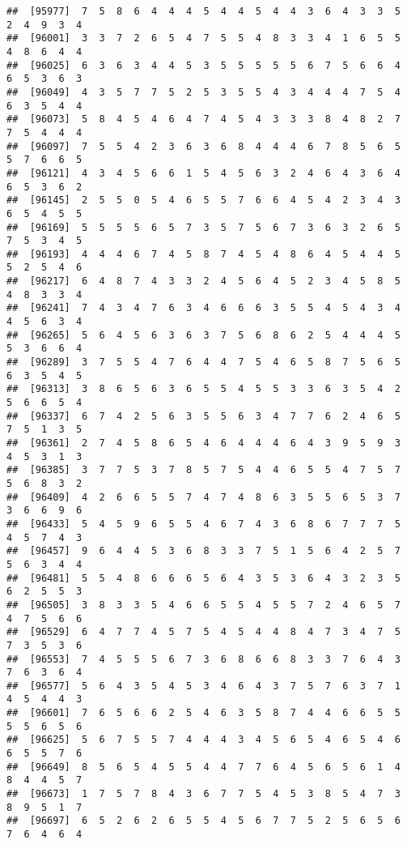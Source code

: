 \documentclass[
]{book}
\begin{document}
\begin{verbatim}
##  [95977]  7  5  8  6  4  4  4  5  4  4  5  4  4  3  6  4  3  3  5  2  4  9  3  4
##  [96001]  3  3  7  2  6  5  4  7  5  5  4  8  3  3  4  1  6  5  5  4  8  6  4  4
##  [96025]  6  3  6  3  4  4  5  3  5  5  5  5  5  6  7  5  6  6  4  6  5  3  6  3
##  [96049]  4  3  5  7  7  5  2  5  3  5  5  4  3  4  4  4  7  5  4  6  3  5  4  4
##  [96073]  5  8  4  5  4  6  4  7  4  5  4  3  3  3  8  4  8  2  7  7  5  4  4  4
##  [96097]  7  5  5  4  2  3  6  3  6  8  4  4  4  6  7  8  5  6  5  5  7  6  6  5
##  [96121]  4  3  4  5  6  6  1  5  4  5  6  3  2  4  6  4  3  6  4  6  5  3  6  2
##  [96145]  2  5  5  0  5  4  6  5  5  7  6  6  4  5  4  2  3  4  3  6  5  4  5  5
##  [96169]  5  5  5  5  6  5  7  3  5  7  5  6  7  3  6  3  2  6  5  7  5  3  4  5
##  [96193]  4  4  4  6  7  4  5  8  7  4  5  4  8  6  4  5  4  4  5  5  2  5  4  6
##  [96217]  6  4  8  7  4  3  3  2  4  5  6  4  5  2  3  4  5  8  5  4  8  3  3  4
##  [96241]  7  4  3  4  7  6  3  4  6  6  6  3  5  5  4  5  4  3  4  4  5  6  3  4
##  [96265]  5  6  4  5  6  3  6  3  7  5  6  8  6  2  5  4  4  4  5  5  3  6  6  4
##  [96289]  3  7  5  5  4  7  6  4  4  7  5  4  6  5  8  7  5  6  5  6  3  5  4  5
##  [96313]  3  8  6  5  6  3  6  5  5  4  5  5  3  3  6  3  5  4  2  5  6  6  5  4
##  [96337]  6  7  4  2  5  6  3  5  5  6  3  4  7  7  6  2  4  6  5  7  5  1  3  5
##  [96361]  2  7  4  5  8  6  5  4  6  4  4  4  6  4  3  9  5  9  3  4  5  3  1  3
##  [96385]  3  7  7  5  3  7  8  5  7  5  4  4  6  5  5  4  7  5  7  5  6  8  3  2
##  [96409]  4  2  6  6  5  5  7  4  7  4  8  6  3  5  5  6  5  3  7  3  6  6  9  6
##  [96433]  5  4  5  9  6  5  5  4  6  7  4  3  6  8  6  7  7  7  5  4  5  7  4  3
##  [96457]  9  6  4  4  5  3  6  8  3  3  7  5  1  5  6  4  2  5  7  5  6  3  4  4
##  [96481]  5  5  4  8  6  6  6  5  6  4  3  5  3  6  4  3  2  3  5  6  2  5  5  3
##  [96505]  3  8  3  3  5  4  6  6  5  5  4  5  5  7  2  4  6  5  7  4  7  5  6  6
##  [96529]  6  4  7  7  4  5  7  5  4  5  4  4  8  4  7  3  4  7  5  7  3  5  3  6
##  [96553]  7  4  5  5  5  6  7  3  6  8  6  6  8  3  3  7  6  4  3  7  6  3  6  4
##  [96577]  5  6  4  3  5  4  5  3  4  6  4  3  7  5  7  6  3  7  1  4  5  4  4  3
##  [96601]  7  6  5  6  6  2  5  4  6  3  5  8  7  4  4  6  6  5  5  5  5  6  5  6
##  [96625]  5  6  7  5  5  7  4  4  4  3  4  5  6  5  4  6  5  4  6  6  5  5  7  6
##  [96649]  8  5  6  5  4  5  5  4  4  7  7  6  4  5  6  5  6  1  4  8  4  4  5  7
##  [96673]  1  7  5  7  8  4  3  6  7  7  5  4  5  3  8  5  4  7  3  8  9  5  1  7
##  [96697]  6  5  2  6  2  6  5  5  4  5  6  7  7  5  2  5  6  5  6  7  6  4  6  4

\end{verbatim}
\end{document}
